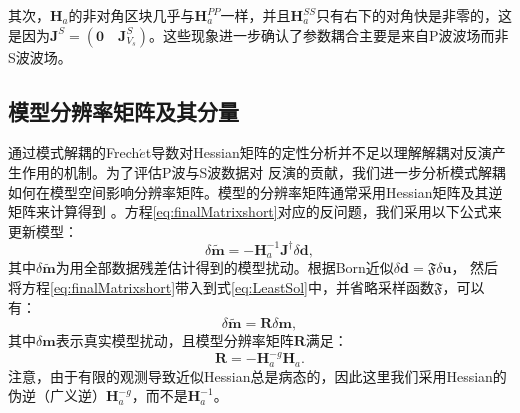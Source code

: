其次，$\mathbf{H}_a$的非对角区块几乎与$\mathbf{H}_a^{PP}$一样，并且$\mathbf{H}_a^{SS}$只有右下的对角快是非零的，这是因为$\mathbf{J}^S=(\mathbf{0}\quad\mathbf{J}^S_{V_s})$。这些现象进一步确认了参数耦合主要是来自P波波场而非S波波场。

\subsection{模型分辨率矩阵及其分量}
通过模式解耦的Frech{$\acute{e}$}t导数对Hessian矩阵的定性分析并不足以理解解耦对反演产生作用的机制。为了评估P波与S波数据对
反演的贡献，我们进一步分析模式解耦如何在模型空间影响分辨率矩阵。模型的分辨率矩阵通常采用Hessian矩阵及其逆矩阵来计算得到
\cite[]{menke:1989,snieder1999inverse}。方程\eqref{eq:finalMatrixshort}对应的反问题，我们采用以下公式来更新模型：
\begin{equation}
        \delta \mathbf{\tilde{m}}=-\mathbf{H}^{-1}_a\mathbf{J}^{\dagger}\delta 
        \mathbf{d},
        \label{eq:LeastSol}
\end{equation}
其中$\delta\mathbf{\tilde{m}}$为用全部数据残差估计得到的模型扰动。根据Born近似$\delta\mathbf{d}=\mathfrak{F}{\delta\mathbf{u}}$，
然后将方程\eqref{eq:finalMatrixshort}带入到式\eqref{eq:LeastSol}中，并省略采样函数$\mathfrak{F}$，可以有：
\begin{equation}
	\delta \mathbf{\tilde{m}}=\mathbf{R}\delta \mathbf{m},
	\label{eq:ResoMatr}
\end{equation}
其中$\delta \mathbf{m}$表示真实模型扰动，且模型分辨率矩阵$\mathbf{R}$满足：
\begin{equation}
        \mathbf{R}=-\mathbf{H}^{-g}_a\mathbf{H}_a. 
        \label{eq:ResoOper} 
\end{equation}
注意，由于有限的观测导致近似Hessian总是病态的，因此这里我们采用Hessian的伪逆（广义逆）$\mathbf{H}^{-g}_a$，而不是$\mathbf{H}^{-1}_a$。

